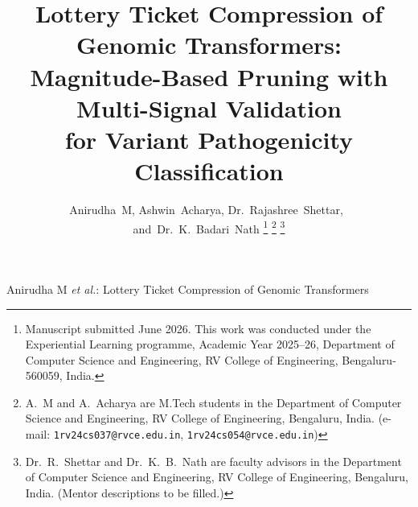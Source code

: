 \documentclass[journal]{IEEEtran}
\begin{document}
\title{Lottery Ticket Compression of Genomic Transformers:\\
       Magnitude-Based Pruning with Multi-Signal Validation\\
       for Variant Pathogenicity Classification}

\author{Anirudha~M,
        Ashwin~Acharya,
        Dr.~Rajashree~Shettar,~
        and~Dr.~K.~Badari~Nath
\thanks{Manuscript submitted June 2026.
This work was conducted under the Experiential Learning
programme, Academic Year 2025--26, Department of Computer
Science and Engineering, RV College of Engineering,
Bengaluru-560059, India.}
\thanks{A.~M and A.~Acharya are M.Tech students in the Department of
Computer Science and Engineering, RV College of Engineering,
Bengaluru, India.
(e-mail: \texttt{1rv24cs037@rvce.edu.in},
         \texttt{1rv24cs054@rvce.edu.in})}
\thanks{Dr.~R.~Shettar and Dr.~K.~B.~Nath are faculty advisors
in the Department of Computer Science and Engineering,
RV College of Engineering, Bengaluru, India.
(Mentor descriptions to be filled.)}}

%
         {Anirudha M \MakeLowercase{\textit{et al.}}:
          Lottery Ticket Compression of Genomic Transformers}

\maketitle
\end{document}
